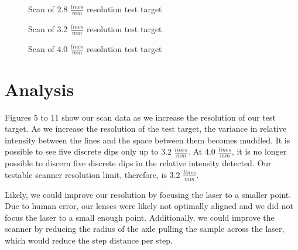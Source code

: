 \documentclass[letterpaper, 12pt]{article}
\begin{document}
  \datathree
\begin{figure}[H]
  \centering
  \caption[caption]{Scan of 2.8 {$\frac{lines}{mm}$} resolution test target}
\end{figure}

  \datathree
\begin{figure}[H]
  \centering
  \caption[caption]{Scan of 3.2 {$\frac{lines}{mm}$} resolution test target}
\end{figure}

  \datathree
\begin{figure}[H]
  \centering
  \caption[caption]{Scan of 4.0 {$\frac{lines}{mm}$} resolution test target}
\end{figure}

\section{Analysis}
\par
Figures 5 to 11 show our scan data as we increase the resolution of our test target. As we increase the resolution of the test target, the variance in relative intensity between the lines and the space between them becomes muddled. It is possible to see five discrete dips only up to 3.2 $\frac{lines}{mm}$. At 4.0 $\frac{lines}{mm}$, it is no longer possible to discern five discrete dips in the relative intensity detected. Our testable scanner resolution limit, therefore, is 3.2 $\frac{lines}{mm}$.
\par
Likely, we could improve our resolution by focusing the laser to a smaller point. Due to human error, our lenses were likely not optimally aligned and we did not focus the laser to a small enough point. Additionally, we could improve the scanner by reducing the radius of the axle pulling the sample across the laser, which would reduce the step distance per step.
\end{document}
